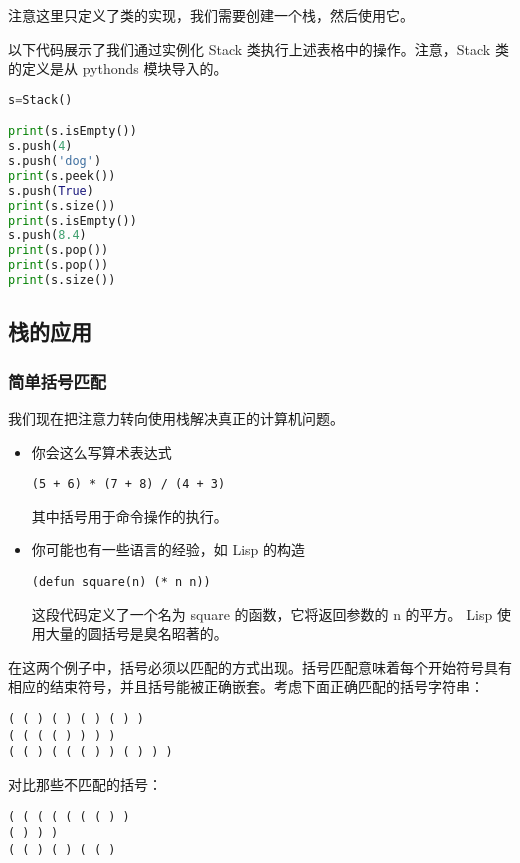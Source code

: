 \documentclass[9pt]{beamer}
\begin{document}
\begin{frame}[fragile]\ft{\subsecname}

注意这里只定义了类的实现，我们需要创建一个栈，然后使用它。
\end{frame}


\begin{frame}[fragile]\ft{\subsecname}
以下代码展示了我们通过实例化 Stack 类执行上述表格中的操作。注意，Stack 类的定义是从 pythonds 模块导入的。

\begin{lstlisting}[language=python,frame=single]
s=Stack()

print(s.isEmpty())
s.push(4)
s.push('dog')
print(s.peek())
s.push(True)
print(s.size())
print(s.isEmpty())
s.push(8.4)
print(s.pop())
print(s.pop())
print(s.size())
\end{lstlisting}
\end{frame}
%
\subsection{栈的应用}


\subsubsection{简单括号匹配}
\begin{frame}[fragile]\ft{\subsubsecname}
我们现在把注意力转向使用栈解决真正的计算机问题。

\begin{itemize}
\item 你会这么写算术表达式
\begin{lstlisting}
(5 + 6) * (7 + 8) / (4 + 3)
\end{lstlisting}
其中括号用于命令操作的执行。
\item 
你可能也有一些语言的经验，如 Lisp 的构造
\begin{lstlisting}
(defun square(n) (* n n))
\end{lstlisting}
这段代码定义了一个名为 square 的函数，它将返回参数的 n 的平方。 Lisp 使用大量的圆括号是臭名昭著的。
\end{itemize}
\end{frame}

\begin{frame}[fragile]\ft{\subsubsecname}
在这两个例子中，括号必须以匹配的方式出现。括号匹配意味着每个开始符号具有相应的结束符号，并且括号能被正确嵌套。考虑下面正确匹配的括号字符串：
\begin{lstlisting}
( ( ) ( ) ( ) ( ) )
( ( ( ( ) ) ) )
( ( ) ( ( ( ) ) ( ) ) )
\end{lstlisting}
对比那些不匹配的括号：
\begin{lstlisting}
( ( ( ( ( ( ( ) )
( ) ) )
( ( ) ( ) ( ( )
\end{lstlisting}
\end{frame}
\end{document}
